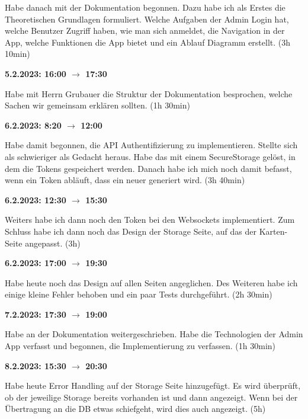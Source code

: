 Habe danach mit der Dokumentation begonnen. Dazu habe ich als Erstes die Theoretischen Grundlagen formuliert. Welche Aufgaben der Admin Login hat, welche Benutzer Zugriff haben, wie man sich anmeldet, die Navigation in der App, welche Funktionen die App bietet und ein Ablauf Diagramm erstellt. (3h 10min)

\vspace{0.5cm}

\textbf{5.2.2023: 16:00 $\rightarrow$ 17:30} \

Habe mit Herrn Grubauer die Struktur der Dokumentation besprochen, welche Sachen wir gemeinsam erklären sollten. (1h 30min)

\vspace{0.5cm}

\textbf{6.2.2023: 8:20 $\rightarrow$ 12:00} \

Habe damit begonnen, die API Authentifizierung zu implementieren. Stellte sich als schwieriger als Gedacht heraus. Habe das mit einem SecureStorage gelöst, in dem die Tokens gespeichert werden. Danach habe ich mich noch damit befasst, wenn ein Token abläuft, dass ein neuer generiert wird. (3h 40min)

\vspace{0.5cm}

\textbf{6.2.2023: 12:30 $\rightarrow$ 15:30} \

Weiters habe ich dann noch den Token bei den Websockets implementiert. Zum Schluss habe ich dann noch das Design der Storage Seite, auf das der Karten-Seite angepasst. (3h)

\vspace{0.5cm}

\textbf{6.2.2023: 17:00 $\rightarrow$ 19:30}

Habe heute noch das Design auf allen Seiten angeglichen. Des Weiteren habe ich einige kleine Fehler behoben und ein paar Tests durchgeführt. (2h 30min)

\vspace{0.5cm}

\textbf{7.2.2023: 17:30 $\rightarrow$ 19:00}

Habe an der Dokumentation weitergeschrieben. Habe die Technologien der Admin App verfasst und begonnen, die Implementierung zu verfassen. (1h 30min)

\vspace{0.5cm}

\textbf{8.2.2023: 15:30 $\rightarrow$ 20:30}

Habe heute Error Handling auf der Storage Seite hinzugefügt. Es wird überprüft, ob der jeweilige Storage bereits vorhanden ist und dann angezeigt. Wenn bei der Übertragung an die DB etwas schiefgeht, wird dies auch angezeigt. (5h)


